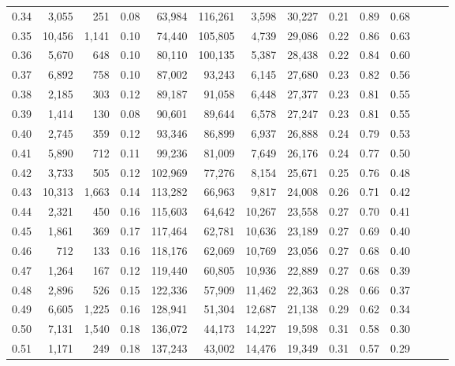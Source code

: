 \begin{tabular}{rrrrrrrrrrrrrr}
0.34 &   3,055 &    251 &  0.08 &   63,984 &  116,261 &   3,598 &  30,227 &  0.21 &  0.89 &      0.68 \\
0.35 &  10,456 &  1,141 &  0.10 &   74,440 &  105,805 &   4,739 &  29,086 &  0.22 &  0.86 &      0.63 \\
0.36 &   5,670 &    648 &  0.10 &   80,110 &  100,135 &   5,387 &  28,438 &  0.22 &  0.84 &      0.60 \\
0.37 &   6,892 &    758 &  0.10 &   87,002 &   93,243 &   6,145 &  27,680 &  0.23 &  0.82 &      0.56 \\
0.38 &   2,185 &    303 &  0.12 &   89,187 &   91,058 &   6,448 &  27,377 &  0.23 &  0.81 &      0.55 \\
0.39 &   1,414 &    130 &  0.08 &   90,601 &   89,644 &   6,578 &  27,247 &  0.23 &  0.81 &      0.55 \\
0.40 &   2,745 &    359 &  0.12 &   93,346 &   86,899 &   6,937 &  26,888 &  0.24 &  0.79 &      0.53 \\
0.41 &   5,890 &    712 &  0.11 &   99,236 &   81,009 &   7,649 &  26,176 &  0.24 &  0.77 &      0.50 \\
0.42 &   3,733 &    505 &  0.12 &  102,969 &   77,276 &   8,154 &  25,671 &  0.25 &  0.76 &      0.48 \\
0.43 &  10,313 &  1,663 &  0.14 &  113,282 &   66,963 &   9,817 &  24,008 &  0.26 &  0.71 &      0.42 \\
0.44 &   2,321 &    450 &  0.16 &  115,603 &   64,642 &  10,267 &  23,558 &  0.27 &  0.70 &      0.41 \\
0.45 &   1,861 &    369 &  0.17 &  117,464 &   62,781 &  10,636 &  23,189 &  0.27 &  0.69 &      0.40 \\
0.46 &     712 &    133 &  0.16 &  118,176 &   62,069 &  10,769 &  23,056 &  0.27 &  0.68 &      0.40 \\
0.47 &   1,264 &    167 &  0.12 &  119,440 &   60,805 &  10,936 &  22,889 &  0.27 &  0.68 &      0.39 \\
0.48 &   2,896 &    526 &  0.15 &  122,336 &   57,909 &  11,462 &  22,363 &  0.28 &  0.66 &      0.37 \\
0.49 &   6,605 &  1,225 &  0.16 &  128,941 &   51,304 &  12,687 &  21,138 &  0.29 &  0.62 &      0.34 \\
0.50 &   7,131 &  1,540 &  0.18 &  136,072 &   44,173 &  14,227 &  19,598 &  0.31 &  0.58 &      0.30 \\
0.51 &   1,171 &    249 &  0.18 &  137,243 &   43,002 &  14,476 &  19,349 &  0.31 &  0.57 &      0.29 \\

\end{tabular}
